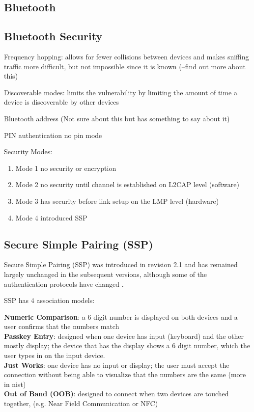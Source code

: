 \documentclass{acm_proc_article-sp}
\begin{document}
\subsection{Bluetooth}
\subsection{Bluetooth Security}
Frequency hopping: allows for fewer collisions between devices and makes sniffing traffic more difficult, but not impossible since it is known (--find out more about this)

Discoverable modes: limits the vulnerability by limiting the amount of time a device is discoverable by other devices

Bluetooth address (Not sure about this but \cite{ma2007keystroke} has something to say about it)

PIN authentication
no pin mode

Security Modes: 
\begin{enumerate}
\item Mode 1 no security or encryption
\item Mode 2 no security until channel is established on L2CAP level (software)
\item Mode 3 has security before link setup on the LMP level (hardware)
\item Mode 4 introduced SSP
\end{enumerate}

\subsection{Secure Simple Pairing (SSP)}
Secure Simple Pairing (SSP) was introduced in revision 2.1 and has remained largely unchanged in the subsequent versions, although some of the authentication protocols have changed \cite{barnickel2012implementing}. 

SSP has 4 association models:

\textbf{Numeric Comparison}: a 6 digit number is displayed on both devices and a user confirms that the numbers match\\
\textbf{Passkey Entry}: designed when one device has input (keyboard) and the other mostly display; the device that has the display shows a 6 digit number, which the user types in on the input device.\\
\textbf{Just Works}: one device has no input or display; the user must accept the connection without being able to visualize that the numbers are the same (more in nist)\\
\textbf{Out of Band (OOB)}: designed to connect when two devices are touched together, (e.g. Near Field Communication or NFC)\\
\end{document}
